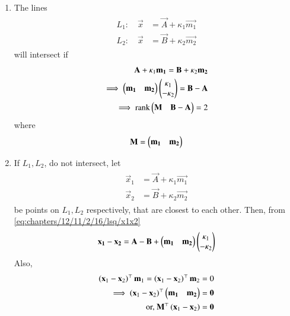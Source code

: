 \begin{enumerate}[label=\thesubsection.\arabic*.,ref=\thesubsection.\theenumi]
	\item The lines
\begin{align}
\begin{split}
	L_1: \quad   \vec{x} &=\vec{A}+ \kappa_1\vec{m_1}
	\\
L_2: \quad        
	\vec{x} &= \vec{B}  + \kappa_2\vec{m_2} 
\end{split}
	    \label{eq:chapters/12/11/2/16/lsq/L1L2}
\end{align}
will intersect if 
\begin{align}
\mathbf{A}+ \kappa_1\mathbf{m_1}
= \mathbf{B}  + \kappa_2\mathbf{m_2} 
\\
\implies 
 \begin{pmatrix}\mathbf{m_1} & \mathbf{m_2}\end{pmatrix}\begin{pmatrix}\kappa_1\\-\kappa_2\end{pmatrix}
	 =\mathbf{B}-\mathbf{A}
 \\
	\implies \text{rank}\begin{pmatrix}\mathbf{M}  
	& \mathbf{B}-\mathbf{A}\end{pmatrix} = 2 
	    \label{eq:chapters/12/11/2/16/lsq/rank}
\end{align}
where
\begin{align}
	\mathbf{M} = 
	\begin{pmatrix}\mathbf{m_1} & \mathbf{m_2}\end{pmatrix} 
\end{align}
\item If $L_1, L_2$, do not intersect, let 
\begin{align}
\begin{split}
	\vec{x}_1 &=\vec{A}+ \kappa_1\vec{m_1}
	\\
	\vec{x}_2 &= \vec{B}  + \kappa_2\vec{m_2} 
\end{split}
	    \label{eq:chapters/12/11/2/16/lsq/x1x2}
\end{align}
be points on 
$L_1, L_2$ respectively, that are closest to each other.
Then, 
	    from \eqref{eq:chapters/12/11/2/16/lsq/x1x2}
\begin{align}
\mathbf{x_1} - \mathbf{x_2} =
	 \mathbf{A}-\mathbf{B}+
 \begin{pmatrix}\mathbf{m_1} & \mathbf{m_2}\end{pmatrix}\begin{pmatrix}\kappa_1\\-\kappa_2\end{pmatrix}
	\label{eq:chapters/12/11/2/16/lsq/x-diff}
\end{align}
Also, 
    \begin{align}
	    \brak{\vec{x}_1 -\vec{x}_2}^\top\vec{m}_1
	    =
	    \brak{\vec{x}_1 -\vec{x}_2}^\top\vec{m}_2
	    =0
	    \\
	    \implies 
	    \brak{\vec{x}_1 -\vec{x}_2}^\top\myvec{\vec{m_1} & \vec{m_2}} = \vec{0}
	    \\
	    \text{or, }	    \vec{M}^\top\brak{\vec{x}_1 -\vec{x}_2} = \vec{0}

\end{align}
\end{enumerate}
